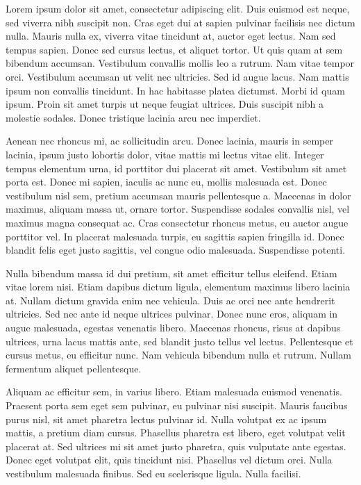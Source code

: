 \documentclass{minimal}
\begin{document}
Lorem ipsum dolor sit amet, consectetur adipiscing elit. Duis euismod est
neque, sed viverra nibh suscipit non. Cras eget dui at sapien pulvinar
facilisis nec dictum nulla. Mauris nulla ex, viverra vitae tincidunt at, auctor
eget lectus. Nam sed tempus sapien. Donec sed cursus lectus, et aliquet tortor.
Ut quis quam at sem bibendum accumsan. Vestibulum convallis mollis leo a
rutrum. Nam vitae tempor orci. Vestibulum accumsan ut velit nec ultricies. Sed
id augue lacus. Nam mattis ipsum non convallis tincidunt. In hac habitasse
platea dictumst. Morbi id quam ipsum. Proin sit amet turpis ut neque feugiat
ultrices. Duis suscipit nibh a molestie sodales. Donec tristique lacinia arcu
nec imperdiet.

Aenean nec rhoncus mi, ac sollicitudin arcu. Donec lacinia, mauris in semper
lacinia, ipsum justo lobortis dolor, vitae mattis mi lectus vitae elit. Integer
tempus elementum urna, id porttitor dui placerat sit amet. Vestibulum sit amet
porta est. Donec mi sapien, iaculis ac nunc eu, mollis malesuada est. Donec
vestibulum nisl sem, pretium accumsan mauris pellentesque a. Maecenas in dolor
maximus, aliquam massa ut, ornare tortor. Suspendisse sodales convallis nisl,
vel maximus magna consequat ac. Cras consectetur rhoncus metus, eu auctor augue
porttitor vel. In placerat malesuada turpis, eu sagittis sapien fringilla id.
Donec blandit felis eget justo sagittis, vel congue odio malesuada. Suspendisse
potenti.

Nulla bibendum massa id dui pretium, sit amet efficitur tellus eleifend. Etiam
vitae lorem nisi. Etiam dapibus dictum ligula, elementum maximus libero lacinia
at. Nullam dictum gravida enim nec vehicula. Duis ac orci nec ante hendrerit
ultricies. Sed nec ante id neque ultrices pulvinar. Donec nunc eros, aliquam in
augue malesuada, egestas venenatis libero. Maecenas rhoncus, risus at dapibus
ultrices, urna lacus mattis ante, sed blandit justo tellus vel lectus.
Pellentesque et cursus metus, eu efficitur nunc. Nam vehicula bibendum nulla et
rutrum. Nullam fermentum aliquet pellentesque.

Aliquam ac efficitur sem, in varius libero. Etiam malesuada euismod venenatis.
Praesent porta sem eget sem pulvinar, eu pulvinar nisi suscipit. Mauris
faucibus purus nisl, sit amet pharetra lectus pulvinar id. Nulla volutpat ex ac
ipsum mattis, a pretium diam cursus. Phasellus pharetra est libero, eget
volutpat velit placerat at. Sed ultrices mi sit amet justo pharetra, quis
vulputate ante egestas. Donec eget volutpat elit, quis tincidunt nisi.
Phasellus vel dictum orci. Nulla vestibulum malesuada finibus. Sed eu
scelerisque ligula. Nulla facilisi.
\end{document}
